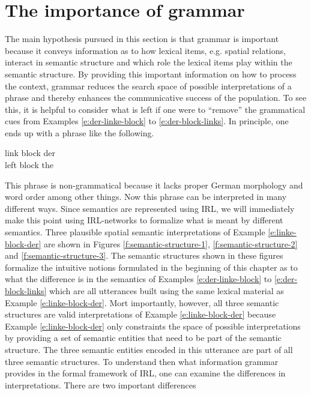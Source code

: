 \section{The importance of grammar}
The main hypothesis pursued in this section is that grammar is important because it 
conveys information as to how lexical items, e.g. spatial relations, interact in semantic structure
and which role the lexical items play within the semantic structure. 
By providing this important information on how to process the context,
grammar reduces the search space of possible interpretations of a phrase and 
thereby enhances the communicative success of the population.
To see this, it is helpful to consider what is left if one were to ``remove'' the 
grammatical cues from Examples \ref{e:der-linke-block} to \ref{e:der-block-links}.
In principle, one ends up with a phrase like the following.
\begin{exe}
\ex\label{e:linke-block-der}
\gll link block der\\
left block the\\
\end{exe}
This phrase is non-grammatical because it lacks proper German morphology
and word order among other things. Now this phrase can 
be interpreted in many different ways. 
Since semantics are represented using IRL, we
will immediately make this point using IRL-networks 
to formalize what is meant by different 
semantics. Three plausible spatial semantic interpretations 
of Example \ref{e:linke-block-der} are 
shown in Figures \ref{f:semantic-structure-1}, 
\ref{f:semantic-structure-2} and \ref{f:semantic-structure-3}.
The semantic structures shown in these figures formalize 
the intuitive notions formulated
in the beginning of this chapter as to what the difference is in 
the semantics of Examples \ref{e:der-linke-block} to \ref{e:der-block-links}
which are all utterances built using the same lexical material as Example \ref{e:linke-block-der}.
Mort importantly, however, all three semantic structures are valid interpretations of 
Example \ref{e:linke-block-der} because Example  \ref{e:linke-block-der} 
only constraints the space of possible interpretations by providing
a set of semantic entities that need to be part of the semantic structure. The three 
semantic entities encoded in this utterance are part of all three semantic structures. 
To understand then what information grammar
provides in the formal framework of IRL, 
one can examine the differences in interpretations. 
There are two important differences 
